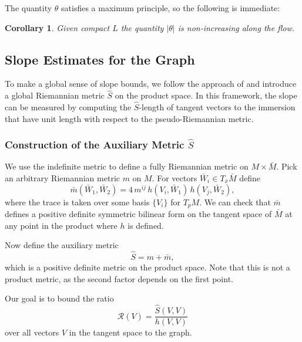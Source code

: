 \documentclass[12pt,letterpaper]{amsart}%
\newcounter{mycounter}
\numberwithin{mycounter}{section}
\theoremstyle{plain}
\newtheorem{corollary}[mycounter]{Corollary}
\numberwithin{equation}{section}
\theoremstyle{definition}
\begin{document}
The quantity $\theta$ satisfies a maximum principle, so the following is immediate:





\begin{corollary}
Given compact $L$ the quantity $\left\vert \theta\right\vert $ is
non-increasing along the flow.
\end{corollary}
\fi

\subsection{Slope Estimates for the Graph} 

To make a global sense of slope bounds, we follow the approach of \cite{BLMR} and introduce a global Riemannian metric 
$\hat{S}$ on the product space. In this framework, the slope can be measured by computing the 
$\hat{S}$-length of tangent vectors to the immersion that have unit length with respect to the pseudo-Riemannian metric.

\subsubsection{Construction of the Auxiliary Metric $\hat{S}$}

We use the indefinite metric to define a fully Riemannian metric on 
$M \times \bar{M}$.  Pick an arbitrary Riemannian metric $m$ on $M$.  
For vectors $\bar{W}_i \in T_{\bar{x}}\bar{M}$ define
\[
\bar{m}(\bar{W}_{1},\bar{W}_{2})
    = 4\, m^{ij}\, h(V_{i},\bar{W}_{1})\, h(V_{j},\bar{W}_{2}),
\]
where the trace is taken over some basis $\{V_i\}$ for $T_{p}M$.  
We can check that $\bar{m}$ defines a positive definite symmetric bilinear form 
on the tangent space of $\bar{M}$ at any point in the product where $h$ 
is defined.

Now define the auxiliary metric
\[
\hat{S} = m + \bar{m},
\]
which is a positive definite metric on the product space.  
Note that this is not a product metric, as the second factor depends 
on the first point.

Our goal is to bound the ratio
\begin{equation}
\mathcal{R}(V) = \frac{\hat{S}(V,V)}{h(V,V)}
\label{def:ratio}
\end{equation}
over all vectors $V$ in the tangent space to the graph.
\end{document}
